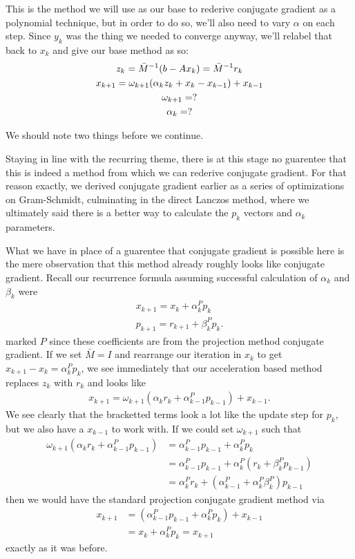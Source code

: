 \documentclass[11pt]{article}
\begin{document}
This is the method we will use as our base to rederive conjugate gradient as a polynomial technique, but in order to do so, we'll also need to vary $\alpha$ on each step. Since $y_k$ was the thing we needed to converge anyway, we'll relabel that back to $x_k$ and give our base method as so: \begin{gather*}
z_k = \bar M^{-1} (b - Ax_k) = \bar M^{-1} r_k\\
x_{k+1} = \omega_{k+1} (\alpha_k z_k + x_k - x_{k-1}) + x_{k-1} \\
\omega_{k+1} = ? \\
\alpha_k = ?
\end{gather*}

We should note two things before we continue.

Staying in line with the recurring theme, there is at this stage no guarentee that this is indeed a method from which we can rederive conjugate gradient. For that reason exactly, we derived conjugate gradient earlier as a series of optimizations on Gram-Schmidt, culminating in the direct Lanczos method, where we ultimately said there is a better way to calculate the $p_k$ vectors and $\alpha_k$ parameters.

What we have in place of a guarentee that conjugate gradient is possible here is the mere observation that this method already roughly looks like conjugate gradient. Recall our recurrence formula assuming successful calculation of $\alpha_k$ and $\beta_k$ were \begin{gather*}
x_{k+1} = x_k + \alpha_k^P p_k \\
p_{k+1} = r_{k+1} + \beta_k^P p_k.
\end{gather*}
marked $P$ since these coefficients are from the projection method conjugate gradient. If we set $\bar M = I$ and rearrange our iteration in $x_k$ to get $x_{k+1} - x_k = \alpha^P_k p_k$, we see immediately that our acceleration based method replaces $z_k$ with $r_k$ and looks like \begin{gather*}
x_{k+1} = \omega_{k+1} (\alpha_k r_k + \alpha_{k-1}^P p_{k-1} ) + x_{k-1}.
\end{gather*}
We see clearly that the bracketted terms look a lot like the update step for $p_k$, but we also have a $x_{k-1}$ to work with. If we could set $\omega_{k+1}$ such that \begin{align*}
\omega_{k+1} (\alpha_k r_k + \alpha_{k-1}^P p_{k-1}) &= \alpha_{k-1}^P p_{k-1} + \alpha_k^P p_k \\
&= \alpha_{k-1}^P p_{k-1} + \alpha_k^P (r_k + \beta_k^P p_{k-1} ) \\
&= \alpha_{k}^P r_k + (\alpha_{k-1}^P + \alpha_k^P \beta_k^P )p_{k-1}
\end{align*}
then we would have the standard projection conjugate gradient method via \begin{align*}
x_{k+1} &= (\alpha_{k-1}^P p_{k-1} + \alpha_k^P p_k) + x_{k-1} \\
&= x_k + \alpha_k^P p_k = x_{k+1}
\end{align*} 
exactly as it was before.
\end{document}
